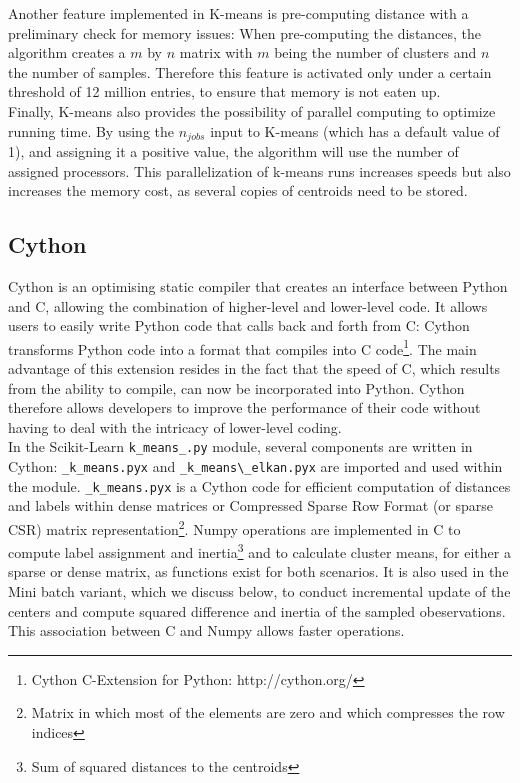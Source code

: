 \documentclass[11pt]{article}
\begin{document}
\noindent Another feature implemented in K-means is pre-computing distance with a preliminary check for memory issues: When pre-computing the distances, the algorithm creates a $m$ by $n$ matrix with $m$ being the number of clusters and $n$ the number of samples. Therefore this feature is activated only under a certain threshold of 12 million entries, to ensure that memory is not eaten up.\\

\noindent Finally, K-means also provides the possibility of parallel computing to optimize running time. By using the $n_{jobs}$ input to K-means (which has a default value of 1), and assigning it a positive value, the algorithm will use the number of assigned processors. This parallelization of k-means runs increases speeds but also increases the memory cost, as several copies of centroids need to be stored. 

\subsection*{Cython}
Cython is an optimising static compiler that creates an interface between Python and C, allowing the combination of higher-level and lower-level code. It allows users to easily write Python code that calls back and forth from C: Cython transforms Python code into a format that compiles into C code\footnote{Cython C-Extension for Python: http://cython.org/}. The main advantage of this extension resides in the fact that the speed of C, which results from the ability to compile, can now be incorporated into Python. Cython therefore allows developers to improve the performance of their code without having to deal with the intricacy of lower-level coding. \\ 

\noindent In the Scikit-Learn \verb|k_means_.py| module, several components are written in Cython: \verb|_k_means.pyx| and \verb|_k_means\_elkan.pyx| are imported and used within the module. \verb|_k_means.pyx| is a Cython code for efficient computation of distances and labels within dense matrices or Compressed Sparse Row Format (or sparse CSR) matrix representation\footnote{Matrix in which most of the elements are zero and which compresses the row indices}. Numpy operations are implemented in C to compute label assignment and inertia\footnote{Sum of squared distances to the centroids} and to calculate cluster means, for either a sparse or dense matrix, as functions exist for both scenarios. It is also used in the Mini batch variant, which we discuss below, to conduct incremental update of the centers and compute squared difference and inertia of the sampled obeservations. This association between C and Numpy allows faster operations.\\
\end{document}
